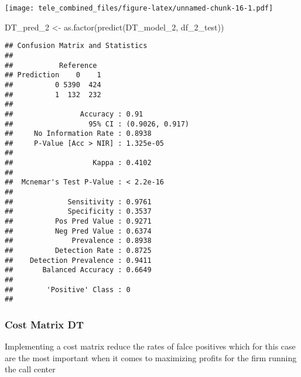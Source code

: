 \documentclass[
]{article}
\newenvironment{Shaded}{\begin{snugshade}}{\end{snugshade}}
\newcommand{\FunctionTok}[1]{\textcolor[rgb]{0.00,0.00,0.00}{#1}}
\newcommand{\NormalTok}[1]{#1}
\newcommand{\OtherTok}[1]{\textcolor[rgb]{0.56,0.35,0.01}{#1}}
\newcommand{\SpecialCharTok}[1]{\textcolor[rgb]{0.00,0.00,0.00}{#1}}
\begin{document}
\texttt{[image: tele\_combined\_files/figure-latex/unnamed-chunk-16-1.pdf]}

\begin{Shaded}
\begin{Highlighting}[]
\NormalTok{DT\_pred\_2 }\OtherTok{\textless{}{-}} \FunctionTok{as.factor}\NormalTok{(}\FunctionTok{predict}\NormalTok{(DT\_model\_2, df\_2\_test))}
\end{Highlighting}
\end{Shaded}

\begin{Shaded}
\end{Shaded}

\begin{verbatim}
## Confusion Matrix and Statistics
## 
##           Reference
## Prediction    0    1
##          0 5390  424
##          1  132  232
##                                          
##                Accuracy : 0.91           
##                  95% CI : (0.9026, 0.917)
##     No Information Rate : 0.8938         
##     P-Value [Acc > NIR] : 1.325e-05      
##                                          
##                   Kappa : 0.4102         
##                                          
##  Mcnemar's Test P-Value : < 2.2e-16      
##                                          
##             Sensitivity : 0.9761         
##             Specificity : 0.3537         
##          Pos Pred Value : 0.9271         
##          Neg Pred Value : 0.6374         
##              Prevalence : 0.8938         
##          Detection Rate : 0.8725         
##    Detection Prevalence : 0.9411         
##       Balanced Accuracy : 0.6649         
##                                          
##        'Positive' Class : 0              
## 
\end{verbatim}

\hypertarget{cost-matrix-dt}{%
\subsubsection{Cost Matrix DT}\label{cost-matrix-dt}}

Implementing a cost matrix reduce the rates of falce positives which for
this case are the most important when it comes to maximizing profits for
the firm running the call center
\end{document}
